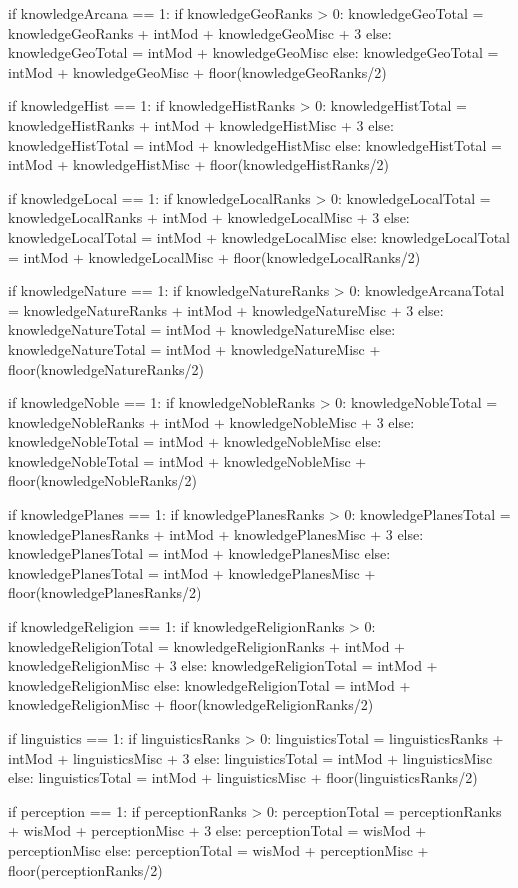 \documentclass[10pt]{article}
\begin{document}
\begin{sagesilent}
if knowledgeArcana == 1:
	 if knowledgeGeoRanks > 0:
	  knowledgeGeoTotal = knowledgeGeoRanks + intMod + knowledgeGeoMisc + 3
	 else:
	  knowledgeGeoTotal = intMod + knowledgeGeoMisc
else:
	 knowledgeGeoTotal = intMod + knowledgeGeoMisc + floor(knowledgeGeoRanks/2)

if knowledgeHist == 1:
	 if knowledgeHistRanks > 0:
	  knowledgeHistTotal = knowledgeHistRanks + intMod + knowledgeHistMisc + 3
	 else:
	  knowledgeHistTotal = intMod + knowledgeHistMisc
else:
	 knowledgeHistTotal = intMod + knowledgeHistMisc + floor(knowledgeHistRanks/2)

if knowledgeLocal == 1:
	 if knowledgeLocalRanks > 0:
	  knowledgeLocalTotal = knowledgeLocalRanks + intMod + knowledgeLocalMisc + 3
	 else:
	  knowledgeLocalTotal = intMod + knowledgeLocalMisc
else:
	 knowledgeLocalTotal = intMod + knowledgeLocalMisc + floor(knowledgeLocalRanks/2)

if knowledgeNature == 1:
	 if knowledgeNatureRanks > 0:
	  knowledgeArcanaTotal = knowledgeNatureRanks + intMod + knowledgeNatureMisc + 3
	 else:
	  knowledgeNatureTotal = intMod + knowledgeNatureMisc
else:
	 knowledgeNatureTotal = intMod + knowledgeNatureMisc + floor(knowledgeNatureRanks/2)

if knowledgeNoble == 1:
	 if knowledgeNobleRanks > 0:
	  knowledgeNobleTotal = knowledgeNobleRanks + intMod + knowledgeNobleMisc + 3
	 else:
	  knowledgeNobleTotal = intMod + knowledgeNobleMisc
else:
	 knowledgeNobleTotal = intMod + knowledgeNobleMisc + floor(knowledgeNobleRanks/2)

if knowledgePlanes == 1:
	 if knowledgePlanesRanks > 0:
	  knowledgePlanesTotal = knowledgePlanesRanks + intMod + knowledgePlanesMisc + 3
	 else:
	  knowledgePlanesTotal = intMod + knowledgePlanesMisc
else:
	 knowledgePlanesTotal = intMod + knowledgePlanesMisc + floor(knowledgePlanesRanks/2)

if knowledgeReligion == 1:
	 if knowledgeReligionRanks > 0:
	  knowledgeReligionTotal = knowledgeReligionRanks + intMod + knowledgeReligionMisc + 3
	 else:
	  knowledgeReligionTotal = intMod + knowledgeReligionMisc
else:
	 knowledgeReligionTotal = intMod + knowledgeReligionMisc + floor(knowledgeReligionRanks/2)

if linguistics == 1:
	 if linguisticsRanks > 0:
	  linguisticsTotal = linguisticsRanks + intMod + linguisticsMisc + 3
	 else:
	  linguisticsTotal = intMod + linguisticsMisc
else:
	 linguisticsTotal = intMod + linguisticsMisc + floor(linguisticsRanks/2)

if perception == 1:
	 if perceptionRanks > 0:
	  perceptionTotal = perceptionRanks + wisMod + perceptionMisc + 3
	 else:
	  perceptionTotal = wisMod + perceptionMisc
else:
	 perceptionTotal = wisMod + perceptionMisc + floor(perceptionRanks/2)


\end{sagesilent}
\end{document}
